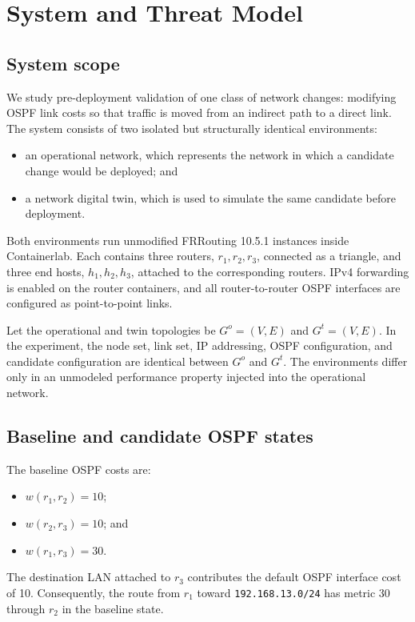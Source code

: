 \section{System and Threat Model}

\subsection{System scope}

We study pre-deployment validation of one class of network changes: modifying OSPF link costs so that traffic is moved from an indirect path to a direct link. The system consists of two isolated but structurally identical environments:
\begin{itemize}
\item an operational network, which represents the network in which a candidate change would be deployed; and
\item a network digital twin, which is used to simulate the same candidate before deployment.
\end{itemize}

Both environments run unmodified FRRouting 10.5.1 instances inside Containerlab. Each contains three routers, $r_1,r_2,r_3$, connected as a triangle, and three end hosts, $h_1,h_2,h_3$, attached to the corresponding routers. IPv4 forwarding is enabled on the router containers, and all router-to-router OSPF interfaces are configured as point-to-point links.

Let the operational and twin topologies be $G^o=(V,E)$ and $G^t=(V,E)$. In the experiment, the node set, link set, IP addressing, OSPF configuration, and candidate configuration are identical between $G^o$ and $G^t$. The environments differ only in an unmodeled performance property injected into the operational network.

\subsection{Baseline and candidate OSPF states}

The baseline OSPF costs are:
\begin{itemize}
\item $w(r_1,r_2)=10$;
\item $w(r_2,r_3)=10$; and
\item $w(r_1,r_3)=30$.
\end{itemize}

The destination LAN attached to $r_3$ contributes the default OSPF interface cost of 10. Consequently, the route from $r_1$ toward \texttt{192.168.13.0/24} has metric 30 through $r_2$ in the baseline state.

